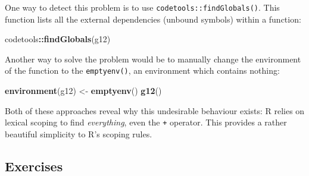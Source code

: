 \documentclass[]{book}
\newenvironment{Shaded}{\begin{snugshade}}{\end{snugshade}}
\newcommand{\KeywordTok}[1]{\textcolor[rgb]{0.13,0.29,0.53}{\textbf{#1}}}
\newcommand{\StringTok}[1]{\textcolor[rgb]{0.31,0.60,0.02}{#1}}
\newcommand{\OperatorTok}[1]{\textcolor[rgb]{0.81,0.36,0.00}{\textbf{#1}}}
\newcommand{\NormalTok}[1]{#1}
\theoremstyle{definition}
\theoremstyle{definition}
\theoremstyle{definition}
\theoremstyle{remark}
\begin{document}
One way to detect this problem is to use
\texttt{codetools::findGlobals()}. This function lists all the external
dependencies (unbound symbols) within a function:

\begin{Shaded}
\begin{Highlighting}[]
\NormalTok{codetools}\OperatorTok{::}\KeywordTok{findGlobals}\NormalTok{(g12)}
\end{Highlighting}
\end{Shaded}

Another way to solve the problem would be to manually change the
environment of the function to the \texttt{emptyenv()}, an environment
which contains nothing:

\begin{Shaded}
\begin{Highlighting}[]
\KeywordTok{environment}\NormalTok{(g12) <-}\StringTok{ }\KeywordTok{emptyenv}\NormalTok{()}
\KeywordTok{g12}\NormalTok{()}
\end{Highlighting}
\end{Shaded}

Both of these approaches reveal why this undesirable behaviour exists: R
relies on lexical scoping to find \emph{everything}, even the \texttt{+}
operator. This provides a rather beautiful simplicity to R's scoping
rules.

\subsection{Exercises}\label{exercises-1}
\end{document}
